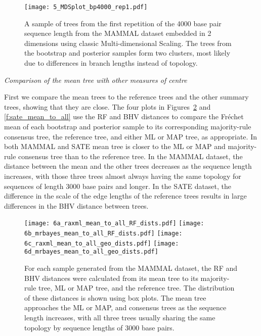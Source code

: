 \documentclass[12pt,letterpaper]{article}
\theoremstyle{plain}
\theoremstyle{definition}
\renewcommand{\subsection}[1]{%
\bigskip
\begin{center}
\begin{large}
\normalfont\itshape #1
\end{large}
\end{center}}
\begin{document}
\begin{figure}[!htb]
\centering
\texttt{[image: 5\_MDSplot\_bp4000\_rep1.pdf]}
\caption{A sample of trees from the first repetition of the 4000 base pair sequence length from the MAMMAL dataset embedded in 2 dimensions using classic Multi-dimensional Scaling. The trees from the bootstrap and posterior samples form two clusters, most likely due to differences in branch lengths instead of topology.}
\centering
\label{f:mds}
\end{figure}


\subsection{Comparison of the mean tree with other measures of centre}
First we compare the mean trees to the reference trees and the other summary trees, showing that they are close.  The four plots in Figures~\ref{f:mammal_mean_to_all} and \ref{f:sate_mean_to_all} use the RF and BHV distances to compare the Fr\'echet mean of each bootstrap and posterior sample to its corresponding majority-rule consensus tree, the reference tree, and either ML or MAP tree, as appropriate.  In both MAMMAL and SATE mean tree is closer to the ML or MAP and majority-rule consensus tree than to the reference tree. In the MAMMAL dataset, the distance between the mean and the other trees decreases as the sequence length increases, with those three trees almost always having the same topology for sequences of length 3000 base pairs and longer.  In the SATE dataset, the difference in the scale of the edge lengths of the reference trees results in large differences in the BHV distance between trees.

\begin{figure}[!htb]
\centering
\texttt{[image: 6a\_raxml\_mean\_to\_all\_RF\_dists.pdf]}
\texttt{[image: 6b\_mrbayes\_mean\_to\_all\_RF\_dists.pdf]} 
\texttt{[image: 6c\_raxml\_mean\_to\_all\_geo\_dists.pdf]} 
\texttt{[image: 6d\_mrbayes\_mean\_to\_all\_geo\_dists.pdf]} 

\caption{For each sample generated from the MAMMAL dataset, the RF and BHV distances were calculated from its mean tree to its majority-rule tree, ML or MAP tree, and the reference tree. The distribution of these distances is shown using box plots. The mean tree approaches the ML or MAP, and consensus trees as the sequence length increases, with all three trees usually sharing the same topology by sequence lengths of 3000 base pairs.}
\centering
\label{f:mammal_mean_to_all}
\end{figure}
\end{document}
